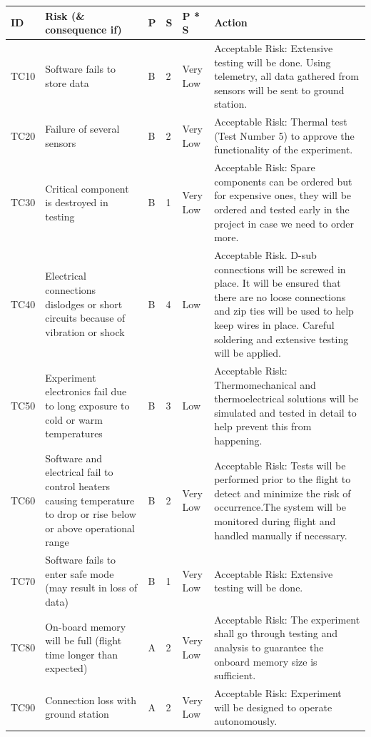 \documentclass[a4paper,12pt,oneside]{article} %
\begin{document}
\begin{landscape}
\begin{longtable}{|m{}| m{} |m{} |m{}|m{}| m{}|}
\hline
\textbf{ID} & \textbf{Risk (\& consequence if)} & \textbf{P} & \textbf{S} & \textbf{P * S} & \textbf{Action} \\ \hline
TC10 & Software fails to store data & B & 2 & \cellcolor[HTML]{34FF34}Very Low & Acceptable Risk: Extensive testing will be done. Using telemetry, all data gathered from sensors will be sent to ground station. \\ \hline
TC20 & Failure of several sensors & B & 2 & \cellcolor[HTML]{34FF34}Very Low & Acceptable Risk: Thermal test (Test Number 5) to approve the functionality of the experiment. \\ \hline
TC30 & Critical component is destroyed in testing & B & 1 & \cellcolor[HTML]{34FF34}Very Low & Acceptable Risk: Spare components can be ordered but for expensive ones, they will be ordered and tested early in the project in case we need to order more. \\ \hline
TC40 & Electrical connections dislodges or short circuits because of vibration or shock & B & 4 & \cellcolor[HTML]{FCFF2F}Low & Acceptable Risk. D-sub connections will be screwed in place. It will be ensured that there are no loose connections and zip ties will be used to help keep wires in place. Careful soldering and extensive testing will be applied. \\ \hline
TC50 & Experiment electronics fail due to long exposure to cold or warm temperatures & B & 3 & \cellcolor[HTML]{FCFF2F}Low & Acceptable Risk: Thermomechanical and thermoelectrical solutions will be simulated and tested in detail to help prevent this from happening. \\ \hline
TC60 & Software and electrical fail to control heaters causing temperature to drop or rise below or above operational range & B & 2 & \cellcolor[HTML]{34FF34}Very Low & Acceptable Risk: Tests will be performed prior to the flight to detect and minimize the risk of occurrence.The system will be monitored during flight and handled manually if necessary. \\ \hline
TC70 & Software fails to enter safe mode (may result in loss of data) & B & 1 & \cellcolor[HTML]{34FF34}Very Low & Acceptable Risk: Extensive testing will be done. \\ \hline
TC80 & On-board memory will be full (flight time longer than expected) & A & 2 & \cellcolor[HTML]{34FF34}Very Low & Acceptable Risk: The experiment shall go through testing and analysis to guarantee the onboard memory size is sufficient.\\ \hline
TC90 & Connection loss with ground station & A & 2 & \cellcolor[HTML]{34FF34}Very Low & Acceptable Risk: Experiment will be designed to operate autonomously. \\ \hline

\end{longtable}
\end{landscape}
\end{document}

